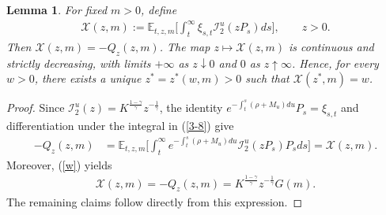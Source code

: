 \documentclass[10pt,a4paper]{amsart}
\newtheorem{lemma}{Lemma}
\begin{document}
\begin{lemma}\label{postmultiplier}
{For fixed $m>0$, define}
\begin{align*}
{\mathcal X(z,m):=\mathbb E_{t,z,m}\bigg[\int_t^\infty\xi_{s,t}\mathcal I_2^u(zP_s)ds\bigg],\qquad z>0.}
\end{align*}
{Then $\mathcal X(z,m)=-Q_z(z,m)$. The map $z\mapsto\mathcal X(z,m)$ is continuous and strictly decreasing, with limits $+\infty$ as $z\downarrow0$ and $0$ as $z\uparrow\infty$. Hence, for every $w>0$, there exists a unique $z^\ast=z^\ast(w,m)>0$ such that $\mathcal X(z^\ast,m)=w$.}
\end{lemma}

\begin{proof}
Since $\mathcal I_2^u(z)=K^{\frac{1-\gamma}{\gamma}}z^{-\frac{1}{\gamma}}$, the identity $e^{-\int_t^s(\rho+M_u)du}P_s=\xi_{s,t}$ and differentiation under the integral in (\ref{3-8}) give
\begin{align}\label{3-7-2}
-Q_z(z,m)&=\mathbb E_{t,z,m}\bigg[\int_t^\infty e^{-\int_t^s(\rho+M_u)du}\mathcal I_2^u(zP_s)P_sds\bigg]=\mathcal X(z,m).
\end{align}
Moreover, (\ref{w}) yields
\begin{align}\label{eqa-6-1}
\mathcal X(z,m)=-Q_z(z,m)=K^{\frac{1-\gamma}{\gamma}}z^{-\frac{1}{\gamma}}G(m).
\end{align}
The remaining claims follow directly from this expression.
\end{proof}
\end{document}
